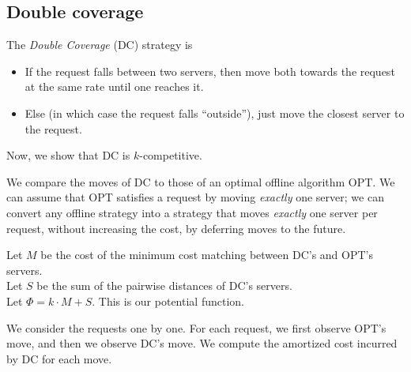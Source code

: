 \documentclass{article}
\begin{document}
\subsection{Double coverage}
The \emph{Double Coverage} (DC) strategy is 
\begin{itemize}
\item
If the request falls between two servers, then move both towards the request at the same rate until one reaches it.
\item
Else (in which case the request falls ``outside''), 
just move the closest server to the request.
\end{itemize}

Now, we show that DC is $k$-competitive.

We compare the moves of DC to those of an optimal offline algorithm
OPT.
We can assume that OPT satisfies a request by moving \emph{exactly} one
server; 
we can convert any offline strategy into
a strategy that moves \emph{exactly} one server per request, without
increasing the cost, by deferring moves to the future.

Let $M$ be the cost of the minimum cost matching between DC's and
OPT's servers.
\\
Let $S$ be the sum of the pairwise distances of DC's servers.
\\
Let $\Phi = k\cdot M + S$. This is our potential function.

We consider the requests one by one.
For each request, we first observe OPT's move, and then we observe
DC's move.
We compute the amortized cost incurred by DC for each move.
\end{document}
